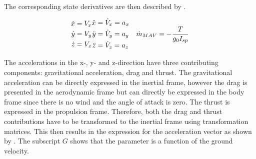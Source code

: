 \noindent
The corresponding state derivatives are then described by .

\begin{align} \label{eq:state_derivatives}
\begin{split} 
\dot{x}&=V_{x}\\
\dot{y}&=V_{y}\\
\dot{z}&=V_{z}
\end{split} 
&
\begin{split}
\ddot{x}&=\dot{V}_{x}=a_{x} \vspace{5pt} \\ \vspace{5pt}
\ddot{y}&=\dot{V}_{y}=a_{y}\\
\ddot{z}&=\dot{V}_{z}=a_{z}
\end{split}
&
\dot{m}_{MAV}=-\dfrac{T}{g_{0}I_{sp}}
\end{align}

\noindent
The accelerations in the x-, y- and z-direction have three contributing components: gravitational acceleration, drag and thrust. The gravitational acceleration can be directly expressed in the inertial frame, however the drag is presented in the aerodynamic frame but can directly be expressed in the body frame since there is no wind and the angle of attack is zero. The thrust is expressed in the propulsion frame. Therefore, both the drag and thrust contributions have to be transformed to the inertial frame using transformation matrices. This then results in the expression for the acceleration vector as shown by . The subscript $G$ shows that the parameter is a function of the ground velocity.

